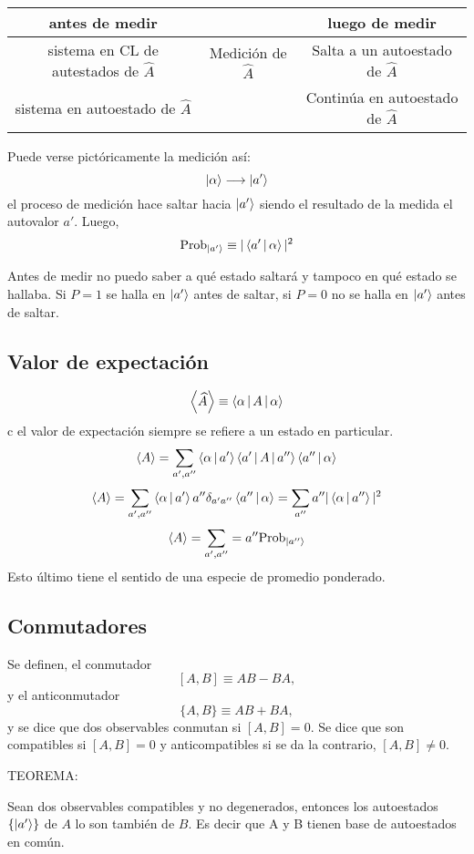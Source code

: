 \documentclass[10pt,oneside]{CBFT_book}
\begin{document}
\begin{tabular}{|c|c|c|}
\hline
antes de medir & & luego de medir \\
\hline 
sistema en CL
de autestados de $\hat{A}$ & Medición de $\hat{A}$ & Salta a un autoestado de $\hat{A}$ \\
\hline 
sistema en 
autoestado de $\hat{A}$  & & Continúa en autoestado de $\hat{A}$ \\
\hline
\end{tabular}

Puede verse pictóricamente la medición así:
\[
	\Ket{\alpha} \longrightarrow \Ket{a'}
\]
el proceso de medición hace saltar hacia $\Ket{a'}$ siendo el resultado de la medida el autovalor $a'$.
Luego,
\[
	\mathrm{Prob}_{\Ket{a'}} \equiv |\Braket{a'|\alpha}|^2
\]

Antes de medir no puedo saber a qué estado saltará y tampoco en qué estado se hallaba. Si $P=1$ se halla en
$\Ket{a'}$ antes de saltar, si $P=0$ no se halla en $\Ket{a'}$ antes de saltar.

\subsection{Valor de expectación}

\[
	\Braket{\widehat{A}} \equiv \Braket{\alpha|A|\alpha}
\]c
el valor de expectación siempre se refiere a un estado en particular.
\[
	\Braket{A} = \sum_{a',a''} \Braket{\alpha|a'}	\Braket{a'|A|a''} \Braket{a''|\alpha}
\]
\[
	\Braket{A} = \sum_{a',a''}  \Braket{\alpha|a'} a''\delta_{a'a''} \Braket{a''|\alpha} =
			\sum_{a''} a''|\Braket{\alpha|a''}|^2
\]
\[
	\Braket{A} = \sum_{a',a''} = a'' \text{Prob}_{\Ket{a''}}
\]
Esto último tiene el sentido de una especie de promedio ponderado.


\subsection{Conmutadores}

Se definen, el conmutador
\[
	[ A, B] \equiv AB - BA,
\]
y el anticonmutador
\[
	\{ A, B \} \equiv AB + BA,
\]
y se dice que dos observables conmutan si $[A,B]=0$. Se dice que son compatibles si $[A,B]=0$ y anticompatibles si se 
da la contrario, $[A,B]\neq 0$.

TEOREMA:

Sean dos observables compatibles y no degenerados, entonces los autoestados $\{ \Ket{a'}\}$ de $A$ lo son también de 
$B$. Es decir que A y B tienen base de autoestados en común.
\end{document}
